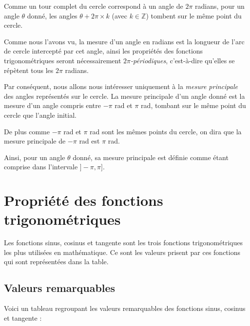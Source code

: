 \documentclass[a4paper]{article}
\begin{document}
			Comme un tour complet du cercle correspond à un angle de $2 \pi$ radians,
			pour un angle $\theta$ donné,
			les angles $\theta + 2 \pi \times k$ (avec $k \in \mathbb{Z}$)
			tombent sur le même point du cercle.

			\medbreak

			Comme nous l'avons vu, la mesure d'un angle en radians est la longueur de 
			l'arc de cercle intercepté par cet angle,
			ainsi les propriétés des fonctions trigonométriques 
			seront nécessairement \emph{$2\pi$-périodiques},
			c'est-à-dire qu'elles se répètent tous les $2 \pi$ radians.

			Par conséquent, nous allons nous intéresser uniquement à la \emph{mesure principale} 
			des angles représentés sur le cercle.
			La mesure principale d'un angle donné est la mesure
			d'un angle compris entre $-\pi$ rad et $\pi$ rad,
			tombant sur le même point du cercle que l'angle initial.

			De plus comme $-\pi$ rad et $\pi$ rad sont les mêmes points du cercle,
			on dira que la mesure principale de $-\pi$ rad est $\pi$ rad.
			
			Ainsi, pour un angle $\theta$ donné,
			sa mesure principale est définie comme étant comprise dans l'intervale $]-\pi, \pi]$.

\newpage

	\section{Propriété des fonctions trigonométriques}

		Les fonctions sinus, cosinus et tangente sont les trois fonctions trigonométriques
		les plus utilisées en mathématique. Ce sont les valeurs prisent par ces fonctions
		qui sont représentées dans la table.

		\subsection{Valeurs remarquables}

			Voici un tableau regroupant les valeurs remarquables des fonctions sinus, cosinus et tangente :
\end{document}
